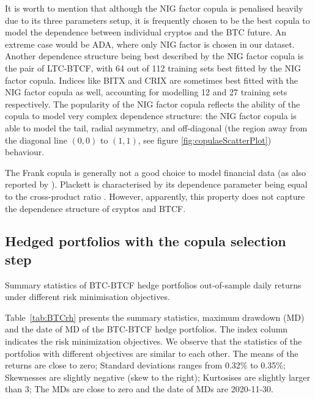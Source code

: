 It is worth to mention that although the NIG factor copula is penalised heavily due to its three parameters setup,
it is frequently chosen to be the best copula to model the dependence
between individual cryptos and the BTC future.
An extreme case would be ADA, where only NIG factor is chosen in our dataset.
Another dependence structure being best described by the NIG factor
copula is the pair of LTC-BTCF, with
64 out of 112 training sets best fitted by the NIG factor copula.
Indices like BITX and CRIX are sometimes best fitted with the NIG
factor copula as well, accounting for modelling 12 and 27 training
sets respectively.
The popularity of the NIG factor copula reflects the ability of the copula to
model very complex dependence structure: the
NIG factor copula is able to model the tail, radial asymmetry, and
off-diagonal (the region away from the diagonal line $(0,0)$ to
$(1,1)$, see figure \ref{fig:copulaeScatterPlot}) behaviour. 
  


The Frank copula is generally not a good choice to model financial
data (as also reported by \cite{barbi2014copula}).
Plackett is characterised by its dependence parameter being equal to
the cross-product ratio %
. 
However, apparently, this property does not capture the dependence
structure of cryptos and BTCF.


\subsection{Hedged portfolios with the copula selection step}\label{subsec:HP2}
\begin{table}[t] \centering
    
    \caption{Summary statistics of BTC-BTCF hedge portfolios out-of-sample daily returns under different risk minimisation objectives.}
\label{tab:BTCrh}
\end{table}
Table~\ref{tab:BTCrh} presents the summary statistics, maximum drawdown (MD) and the date of MD of the BTC-BTCF hedge portfolios.
The index column indicates the risk minimization objectives.
We observe that the statistics of the portfolios with different objectives are similar to each other.
The means of the returns are close to zero;
Standard deviations ranges from 0.32\% to 0.35\%;
Skewnesses are slightly negative (skew to the right);
Kurtosises are slightly larger than 3;
The MDs are close to zero and the date of MDs are 2020-11-30.

